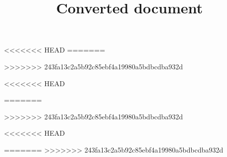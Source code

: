 \documentclass[output=book,
  modfonts 
		  ]{langscibook}
\title{Converted document} %
\begin{document}
     
 
<<<<<<< HEAD
=======
 
>>>>>>> 243fa13c2a5b92c85ebf4a19980a5bdbcdba932d
 

\maketitle                
\frontmatter

\tableofcontents
% 
% 
%  
\mainmatter         
  

 
<<<<<<< HEAD


=======

>>>>>>> 243fa13c2a5b92c85ebf4a19980a5bdbcdba932d



<<<<<<< HEAD
 
=======
>>>>>>> 243fa13c2a5b92c85ebf4a19980a5bdbcdba932d
 
\end{document}
